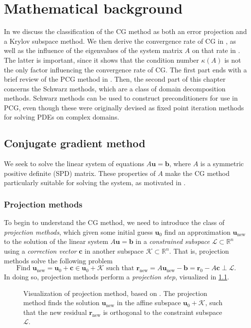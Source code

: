\chapter{Mathematical background}\label{ch:background}
In  we discuss the classification of the CG method as both an error projection and a Krylov subspace method. We then derive the convergence rate of CG in , as well as the influence of the eigenvalues of the system matrix $A$ on that rate in . The latter is important, since it shows that the condition number $\kappa(A)$ is not the only factor influencing the convergence rate of CG. The first part ends with a brief review of the PCG method in . Then, the second part of this chapter  concerns the Schwarz methods, which are a class of domain decomposition methods. Schwarz methods can be used to construct preconditioners for use in PCG, even though these were originally devised as fixed point iteration methods for solving PDEs on complex domains.

\section{Conjugate gradient method}\label{sec:cg_method}
We seek to solve the linear system of equations $A\mathbf{u} = \mathbf{b}$, where $A$ is a symmetric positive definite (SPD) matrix. These properties of $A$ make the CG method particularly suitable for solving the system, as motivated in .

\subsection{Projection methods}
To begin to understand the CG method, we need to introduce the class of \textit{projection methods}, which given some initial guess $\mathbf{u}_0$ find an approximation $\mathbf{u}_{\text{new}}$ to the solution of the linear system $A\mathbf{u} = \mathbf{b}$ in a \textit{constrained subspace} $\mathcal{L}\subset\mathbb{R}^n$ using a \textit{correction vector} $\mathbf{c}$ in another subspace $\mathcal{K}\subset\mathbb{R}^n$. That is, projection methods solve the following problem \cite[Equation 5.3]{iter_method_saad}
\[
  \text{Find } \mathbf{u}_{\text{new}} = \mathbf{u}_0 + \mathbf{c} \in \mathbf{u}_0 + \mathcal{K} \text{ such that } \mathbf{r}_{\text{new}} =  A\mathbf{u}_{\text{new}} - \mathbf{b} = \mathbf{r}_0 - A\mathbf{c} \perp \mathcal{L}.
\]
In doing so, projection methods perform a \textit{projection step}, visualized in \cref{fig:projection_method}.
\begin{figure}[H]
  \centering
  
  \caption{Visualization of projection method, based on \cite[Figure 5.1]{iter_method_saad}. The projection method finds the solution $\mathbf{u}_{\text{new}}$ in the affine subspace $\mathbf{u}_0 + \mathcal{K}$, such that the new residual $\mathbf{r}_{\text{new}}$ is orthogonal to the constraint subspace $\mathcal{L}$.}
  \label{fig:projection_method}
\end{figure}

